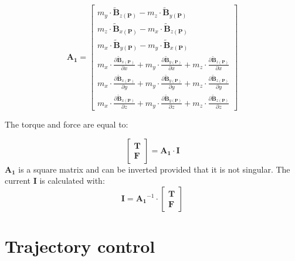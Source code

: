 \begin{equation}
\mathbf{A_1}=\begin{bmatrix}
m_y\cdot \mathbf{\widetilde{B}}_{z(\mathbf{P})}-m_z\cdot \mathbf{\widetilde{B}}_{y(\mathbf{P})}
\\
m_z\cdot \mathbf{\widetilde{B}}_{x(\mathbf{P})}-m_x\cdot \mathbf{\widetilde{B}}_{z(\mathbf{P})}
\\ 
m_x\cdot \mathbf{\widetilde{B}}_{y(\mathbf{P})}-m_y\cdot \mathbf{\widetilde{B}}_{x(\mathbf{P})}
\\
m_x\cdot\frac{{\partial {\mathbf{\widetilde{B}}}_{x(\mathbf{P})}}}{\partial x}+m_y\cdot\frac{{\partial {\mathbf{\widetilde{B}}}_{y(\mathbf{P})}}}{\partial x}+m_z\cdot\frac{{\partial {\mathbf{\widetilde{B}}}_{z(\mathbf{P})}}}{\partial x}
\\ 
m_x\cdot\frac{{\partial {\mathbf{\widetilde{B}}}_{x(\mathbf{P})}}}{\partial y}+m_y\cdot\frac{{\partial {\mathbf{\widetilde{B}}}_{y(\mathbf{P})}}}{\partial y}+m_z\cdot\frac{{\partial {\mathbf{\widetilde{B}}}_{z(\mathbf{P})}}}{\partial y}
\\ 
m_x\cdot\frac{{\partial {\mathbf{\widetilde{B}}}_{x(\mathbf{P})}}}{\partial z}+m_y\cdot\frac{{\partial {\mathbf{\widetilde{B}}}_{y(\mathbf{P})}}}{\partial z}+m_z\cdot\frac{{\partial {\mathbf{\widetilde{B}}}_{z(\mathbf{P})}}}{\partial z}
\end{bmatrix}
\label{A1}
\end{equation}

The torque and force are equal to:

\begin{equation}
\label{FullEq2}
\begin{bmatrix}
\mathbf{T}
\\ 
\mathbf{F}
\end{bmatrix}=\mathbf{A_1}\cdot\mathbf{I}
\end{equation}
$\mathbf{A_1}$ is a square matrix and can be inverted provided that it is not singular. The current $\mathbf{I}$ is calculated with:
\begin{equation}
\mathbf{I}=\mathbf{A_1}^{-1}\cdot\begin{bmatrix}
\mathbf{T}
\\ 
\mathbf{F}
\end{bmatrix}
\label{FullEq3}
\end{equation}


\section{Trajectory control}\label{sec:TrajectoryControl}


